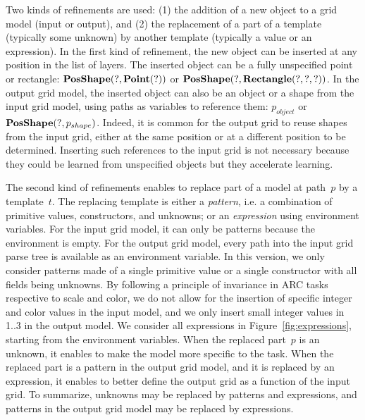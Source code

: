 \documentclass[a4paper]{llncs}
\begin{document}
Two kinds of refinements are used: (1) the addition of a new object to
a grid model (input or output), and (2) the replacement of a part of a
template (typically some unknown) by another template (typically a
value or an expression).
%
In the first kind of refinement, the new object can be inserted at any
position in the list of layers. The inserted object can be a fully
unspecified point or rectangle: ${\bf PosShape}(?, {\bf Point}(?))$ or
${\bf PosShape}(?, {\bf Rectangle}(?,?,?))$. In the output grid model,
the inserted object can also be an object or a shape from the input
grid model, using paths as variables to reference them: $p_{object}$
or ${\bf PosShape}(?, p_{shape})$. Indeed, it is common for the output
grid to reuse shapes from the input grid, either at the same position
or at a different position to be determined. Inserting such references
to the input grid is not necessary because they could be learned from
unspecified objects but they accelerate learning.

The second kind of refinements enables to replace part of a model at
path~$p$ by a template~$t$. The replacing template is either a {\em
  pattern}, i.e. a combination of primitive values, constructors, and
unknowns; or an {\em expression} using environment variables. For the
input grid model, it can only be patterns because the environment is
empty. For the output grid model, every path into the input grid parse
tree is available as an environment variable.
%
In this version, we only consider patterns made of a single primitive
value or a single constructor with all fields being unknowns. By
following a principle of invariance in ARC tasks respective to scale
and color, we do not allow for the insertion of specific integer and
color values in the input model, and we only insert small integer
values in 1..3 in the output model.
%
We consider all expressions in Figure~\ref{fig:expressions}, starting
from the environment variables.
%
When the replaced part~$p$ is an unknown, it enables to make the model
more specific to the task. When the replaced part is a pattern in the
output grid model, and it is replaced by an expression, it enables to
better define the output grid as a function of the input grid. To
summarize, unknowns may be replaced by patterns and expressions, and
patterns in the output grid model may be replaced by expressions.
\end{document}
